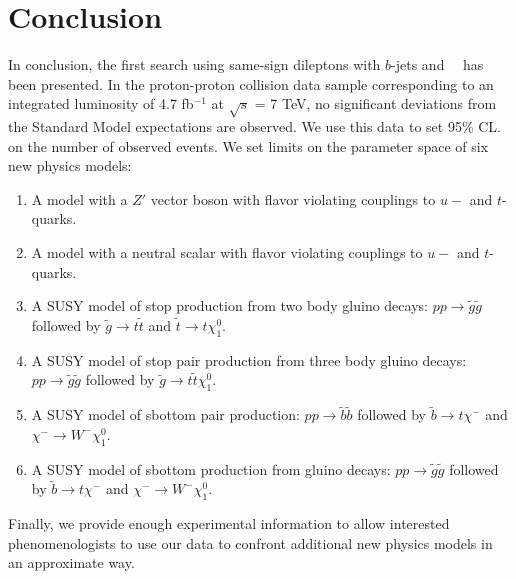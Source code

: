 \section{Conclusion}
\label{sec:conclusion}
In conclusion, the first search using same-sign dileptons with $b$-jets and \met~~has 
been presented. In the
proton-proton collision data sample corresponding to an integrated luminosity of 
 4.7 fb$^{-1}$ at $\sqrt{s}$ = 7 TeV,
no significant deviations from the Standard Model expectations are observed. 
We use this data to set 95\% CL. on the
number of observed events.
We set limits on the parameter space of six new physics models:
\begin{enumerate}
\item A model with a $Z'$ vector boson with flavor violating couplings to $u-$ and $t$-quarks.

\item A model with a neutral scalar with flavor violating couplings to $u-$ and $t$-quarks.

\item A SUSY model of stop production from two body gluino decays: 
$pp \to \widetilde{g} \widetilde{g}$ followed by
$\widetilde{g} \to t\widetilde{t}$ and $\widetilde{t} \to t \chi_1^0$.

\item A SUSY model of stop pair production from three body gluino decays:
$pp \to \widetilde{g} \widetilde{g}$ followed by
$\widetilde{g} \to t\widetilde{t}\chi_1^0$.

\item A SUSY model of sbottom pair production: $pp \to \tilde{b}\tilde{b}$ followed
by $\tilde{b} \to t\chi^{-}$ and $\chi^{-} \to W^- \chi_1^0$.

\item A SUSY model of sbottom production from gluino decays:
$pp \to \widetilde{g} \widetilde{g}$ followed by
$\widetilde{b} \to t\chi^-$ and $\chi^{-} \to W^- \chi_1^0$.
\end{enumerate}

\noindent Finally, we provide enough experimental information to allow interested
phenomenologists to use our data to confront additional new physics models in 
an approximate way.
